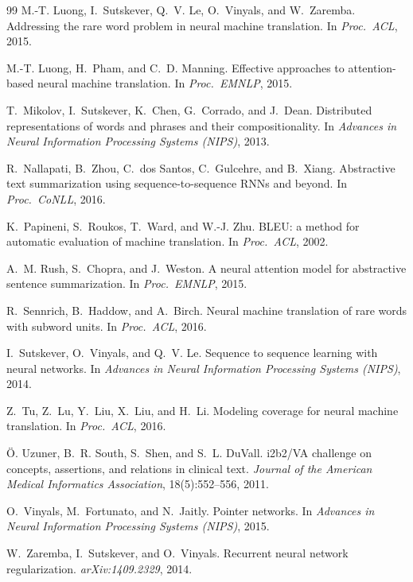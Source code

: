 \documentclass{article}
\begin{document}
\begin{thebibliography}{99}
M.-T. Luong, I.~Sutskever, Q.~V. Le, O.~Vinyals, and W.~Zaremba.
\newblock Addressing the rare word problem in neural machine translation.
\newblock In \emph{Proc.\ ACL}, 2015.

M.-T. Luong, H.~Pham, and C.~D. Manning.
\newblock Effective approaches to attention-based neural machine translation.
\newblock In \emph{Proc.\ EMNLP}, 2015.

T.~Mikolov, I.~Sutskever, K.~Chen, G.~Corrado, and J.~Dean.
\newblock Distributed representations of words and phrases and their compositionality.
\newblock In \emph{Advances in Neural Information Processing Systems (NIPS)}, 2013.

R.~Nallapati, B.~Zhou, C.~dos Santos, C.~Gulcehre, and B.~Xiang.
\newblock Abstractive text summarization using sequence-to-sequence RNNs and beyond.
\newblock In \emph{Proc.\ CoNLL}, 2016.

K.~Papineni, S.~Roukos, T.~Ward, and W.-J. Zhu.
\newblock BLEU: a method for automatic evaluation of machine translation.
\newblock In \emph{Proc.\ ACL}, 2002.

A.~M. Rush, S.~Chopra, and J.~Weston.
\newblock A neural attention model for abstractive sentence summarization.
\newblock In \emph{Proc.\ EMNLP}, 2015.

R.~Sennrich, B.~Haddow, and A.~Birch.
\newblock Neural machine translation of rare words with subword units.
\newblock In \emph{Proc.\ ACL}, 2016.

I.~Sutskever, O.~Vinyals, and Q.~V. Le.
\newblock Sequence to sequence learning with neural networks.
\newblock In \emph{Advances in Neural Information Processing Systems (NIPS)}, 2014.

Z.~Tu, Z.~Lu, Y.~Liu, X.~Liu, and H.~Li.
\newblock Modeling coverage for neural machine translation.
\newblock In \emph{Proc.\ ACL}, 2016.

\"O. Uzuner, B.~R. South, S.~Shen, and S.~L. DuVall.
 i2b2/VA challenge on concepts, assertions, and relations in clinical
text.
\newblock \emph{Journal of the American Medical Informatics Association},
18(5):552--556, 2011.

O.~Vinyals, M.~Fortunato, and N.~Jaitly.
\newblock Pointer networks.
\newblock In \emph{Advances in Neural Information Processing Systems (NIPS)}, 2015.

W.~Zaremba, I.~Sutskever, and O.~Vinyals.
\newblock Recurrent neural network regularization.
\newblock \emph{arXiv:1409.2329}, 2014.

\end{thebibliography}
\end{document}
